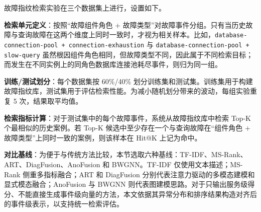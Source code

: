 \begin{table}[htbp]
    \centering
    \label{tab:anomaly_ratio}
    \ChapFiveTableSetup
    \setlength{\tabcolsep}{4pt}
    \setlength{\tabcolsep}{4.5pt}
\end{table}

故障指纹检索实验在三个数据集上进行，设置如下。

\textbf{检索单元定义}：按照“故障组件角色 + 故障类型”对故障事件分组。只有当历史故障与查询故障在这两个维度上同时一致时，才视为相关样本。比如，\texttt{database-connection-pool + connection-exhaustion} 与 \texttt{database-connection-pool + slow-query} 虽然根因组件角色相同，但故障类型不同，因此属于不同检索目标；而发生在不同实例上的同角色数据库连接池耗尽事件，则归为同一组。

\textbf{训练/测试划分}：每个数据集按 60\%/40\% 划分训练集和测试集。训练集用于构建故障指纹库，测试集用于评估检索性能。为减小随机划分带来的波动，每组实验重复 5 次，结果取平均值。

\textbf{检索指标计算}：对于测试集中的每个故障事件，系统从故障指纹库中检索 Top-K 个最相似的历史案例。若 Top-K 候选中至少存在一个与查询故障在“组件角色 + 故障类型”上同时一致的案例，则该样本在 Hit@K 上记为命中。

\textbf{对比基线}：为便于与传统方法比较，本节选取六种基线：TF-IDF、MS-Rank、ART、DiagFusion、AnoFusion 和 BWGNN。TF-IDF 仅使用文本描述；MS-Rank 侧重多指标融合；ART 和 DiagFusion 分别代表注意力驱动的多模态建模和显式模态融合；AnoFusion 与 BWGNN 则代表图建模思路。对于只输出服务级得分、不能直接生成事件级向量的方法，本文依据其异常分布和排序结果构造对齐后的事件级表示，以支持统一检索评估。

